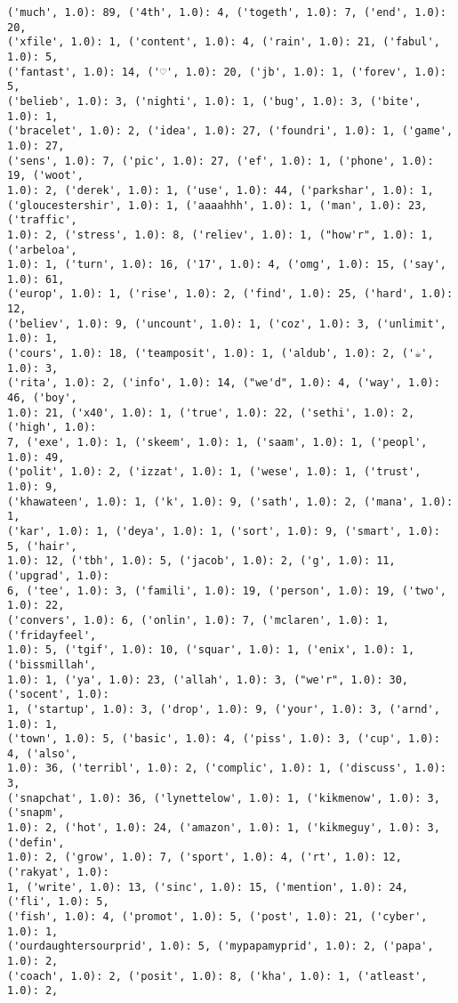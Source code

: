\documentclass[11pt]{article}
\begin{document}
\begin{Verbatim}[commandchars=\\\{\}]
('much', 1.0): 89, ('4th', 1.0): 4, ('togeth', 1.0): 7, ('end', 1.0): 20,
('xfile', 1.0): 1, ('content', 1.0): 4, ('rain', 1.0): 21, ('fabul', 1.0): 5,
('fantast', 1.0): 14, ('♡', 1.0): 20, ('jb', 1.0): 1, ('forev', 1.0): 5,
('belieb', 1.0): 3, ('nighti', 1.0): 1, ('bug', 1.0): 3, ('bite', 1.0): 1,
('bracelet', 1.0): 2, ('idea', 1.0): 27, ('foundri', 1.0): 1, ('game', 1.0): 27,
('sens', 1.0): 7, ('pic', 1.0): 27, ('ef', 1.0): 1, ('phone', 1.0): 19, ('woot',
1.0): 2, ('derek', 1.0): 1, ('use', 1.0): 44, ('parkshar', 1.0): 1,
('gloucestershir', 1.0): 1, ('aaaahhh', 1.0): 1, ('man', 1.0): 23, ('traffic',
1.0): 2, ('stress', 1.0): 8, ('reliev', 1.0): 1, ("how'r", 1.0): 1, ('arbeloa',
1.0): 1, ('turn', 1.0): 16, ('17', 1.0): 4, ('omg', 1.0): 15, ('say', 1.0): 61,
('europ', 1.0): 1, ('rise', 1.0): 2, ('find', 1.0): 25, ('hard', 1.0): 12,
('believ', 1.0): 9, ('uncount', 1.0): 1, ('coz', 1.0): 3, ('unlimit', 1.0): 1,
('cours', 1.0): 18, ('teamposit', 1.0): 1, ('aldub', 1.0): 2, ('☕', 1.0): 3,
('rita', 1.0): 2, ('info', 1.0): 14, ("we'd", 1.0): 4, ('way', 1.0): 46, ('boy',
1.0): 21, ('x40', 1.0): 1, ('true', 1.0): 22, ('sethi', 1.0): 2, ('high', 1.0):
7, ('exe', 1.0): 1, ('skeem', 1.0): 1, ('saam', 1.0): 1, ('peopl', 1.0): 49,
('polit', 1.0): 2, ('izzat', 1.0): 1, ('wese', 1.0): 1, ('trust', 1.0): 9,
('khawateen', 1.0): 1, ('k', 1.0): 9, ('sath', 1.0): 2, ('mana', 1.0): 1,
('kar', 1.0): 1, ('deya', 1.0): 1, ('sort', 1.0): 9, ('smart', 1.0): 5, ('hair',
1.0): 12, ('tbh', 1.0): 5, ('jacob', 1.0): 2, ('g', 1.0): 11, ('upgrad', 1.0):
6, ('tee', 1.0): 3, ('famili', 1.0): 19, ('person', 1.0): 19, ('two', 1.0): 22,
('convers', 1.0): 6, ('onlin', 1.0): 7, ('mclaren', 1.0): 1, ('fridayfeel',
1.0): 5, ('tgif', 1.0): 10, ('squar', 1.0): 1, ('enix', 1.0): 1, ('bissmillah',
1.0): 1, ('ya', 1.0): 23, ('allah', 1.0): 3, ("we'r", 1.0): 30, ('socent', 1.0):
1, ('startup', 1.0): 3, ('drop', 1.0): 9, ('your', 1.0): 3, ('arnd', 1.0): 1,
('town', 1.0): 5, ('basic', 1.0): 4, ('piss', 1.0): 3, ('cup', 1.0): 4, ('also',
1.0): 36, ('terribl', 1.0): 2, ('complic', 1.0): 1, ('discuss', 1.0): 3,
('snapchat', 1.0): 36, ('lynettelow', 1.0): 1, ('kikmenow', 1.0): 3, ('snapm',
1.0): 2, ('hot', 1.0): 24, ('amazon', 1.0): 1, ('kikmeguy', 1.0): 3, ('defin',
1.0): 2, ('grow', 1.0): 7, ('sport', 1.0): 4, ('rt', 1.0): 12, ('rakyat', 1.0):
1, ('write', 1.0): 13, ('sinc', 1.0): 15, ('mention', 1.0): 24, ('fli', 1.0): 5,
('fish', 1.0): 4, ('promot', 1.0): 5, ('post', 1.0): 21, ('cyber', 1.0): 1,
('ourdaughtersourprid', 1.0): 5, ('mypapamyprid', 1.0): 2, ('papa', 1.0): 2,
('coach', 1.0): 2, ('posit', 1.0): 8, ('kha', 1.0): 1, ('atleast', 1.0): 2,

\end{Verbatim}
\end{document}
